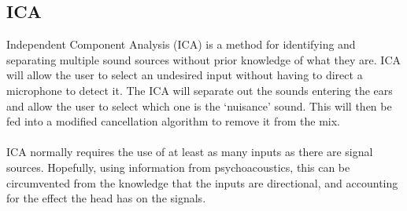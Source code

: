 \subsection{ICA}
Independent Component Analysis (ICA) is a method for identifying and separating multiple sound sources without prior knowledge of what they are.
ICA will allow the user to select an undesired input without having to direct a microphone to detect it.
The ICA will separate out the sounds entering the ears and allow the user to select which one is the `nuisance' sound.
This will then be fed into a modified cancellation algorithm to remove it from the mix.
\\
\\
ICA normally requires the use of at least as many inputs as there are signal sources\cite{AdvancedDSPing}.
Hopefully, using information from psychoacoustics, this can be circumvented from the knowledge that the inputs are directional, and accounting for the effect the head has on the signals.
